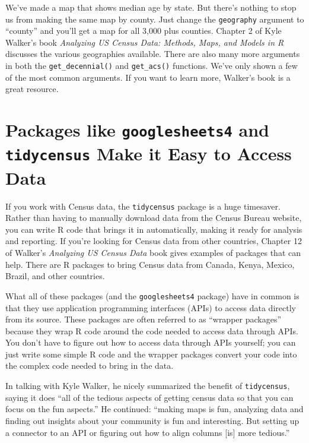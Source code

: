 \documentclass[
]{book}
\begin{document}
We've made a map that shows median age by state. But there's nothing to stop us from making the same map by county. Just change the \texttt{geography} argument to ``county'' and you'll get a map for all 3,000 plus counties. Chapter 2 of Kyle Walker's book \emph{Analyzing US Census Data: Methods, Maps, and Models in R} discusses the various geographies available. There are also many more arguments in both the \texttt{get\_decennial()} and \texttt{get\_acs()} functions. We've only shown a few of the most common arguments. If you want to learn more, Walker's book is a great resource.

\hypertarget{packages-like-googlesheets4-and-tidycensus-make-it-easy-to-access-data}{%
\section*{\texorpdfstring{Packages like \texttt{googlesheets4} and \texttt{tidycensus} Make it Easy to Access Data}{Packages like googlesheets4 and tidycensus Make it Easy to Access Data}}\label{packages-like-googlesheets4-and-tidycensus-make-it-easy-to-access-data}}

If you work with Census data, the \texttt{tidycensus} package is a huge timesaver. Rather than having to manually download data from the Census Bureau website, you can write R code that brings it in automatically, making it ready for analysis and reporting. If you're looking for Census data from other countries, Chapter 12 of Walker's \emph{Analyzing US Census Data} book gives examples of packages that can help. There are R packages to bring Census data from Canada, Kenya, Mexico, Brazil, and other countries.

What all of these packages (and the \texttt{googlesheets4} package) have in common is that they use application programming interfaces (APIs) to access data directly from its source. These packages are often referred to as ``wrapper packages'' because they wrap R code around the code needed to access data through APIs. You don't have to figure out how to access data through APIs yourself; you can just write some simple R code and the wrapper packages convert your code into the complex code needed to bring in the data.

In talking with Kyle Walker, he nicely summarized the benefit of \texttt{tidycensus}, saying it does ``all of the tedious aspects of getting census data so that you can focus on the fun aspects.'' He continued: ``making maps is fun, analyzing data and finding out insights about your community is fun and interesting. But setting up a connector to an API or figuring out how to align columns {[}is{]} more tedious.''
\end{document}
